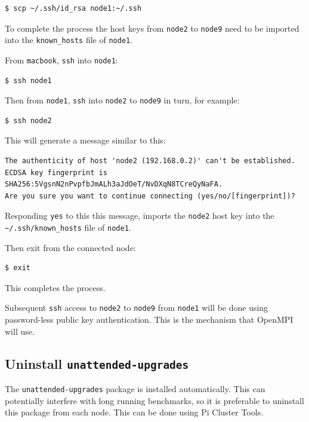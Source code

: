 \documentclass{report}
\begin{document}
\lstset{style=type}
\begin{lstlisting}
$ scp ~/.ssh/id_rsa node1:~/.ssh
\end{lstlisting}

To complete the process the host keys from \verb|node2| to \verb|node9| need to be imported into the \verb|known_hosts| file of \verb|node1|.

From \verb|macbook|, \verb|ssh| into \verb|node1|:

\lstset{style=type}
\begin{lstlisting}[]
$ ssh node1
\end{lstlisting}

Then from \verb|node1|, \verb|ssh| into \verb|node2| to \verb|node9| in turn, for example:

\lstset{style=type}
\begin{lstlisting}[]
$ ssh node2
\end{lstlisting}


This will generate a message similar to this:

\lstset{style=type}
\begin{lstlisting}[]
The authenticity of host 'node2 (192.168.0.2)' can't be established.
ECDSA key fingerprint is SHA256:5VgsnN2nPvpfbJmALh3aJdOeT/NvDXqN8TCreQyNaFA.
Are you sure you want to continue connecting (yes/no/[fingerprint])?
\end{lstlisting}

Responding \verb|yes| to this this message, imports the \verb|node2| host key into the \verb|~/.ssh/known_hosts| file of \verb|node1|.

Then exit from the connected node:

\lstset{style=type}
\begin{lstlisting}[]
$ exit
\end{lstlisting}

This completes the process.

Subsequent \verb|ssh| access to \verb|node2| to \verb|node9| from \verb|node1| will be done using password-less public key authentication. This is the mechanism that OpenMPI will use.


%
%

\subsection{Uninstall \texttt{unattended-upgrades}}

The \verb|unattended-upgrades| package is installed automatically. This can potentially interfere with long running benchmarks, so it is preferable to uninstall this package from each node. This can be done using Pi Cluster Tools.
\end{document}
